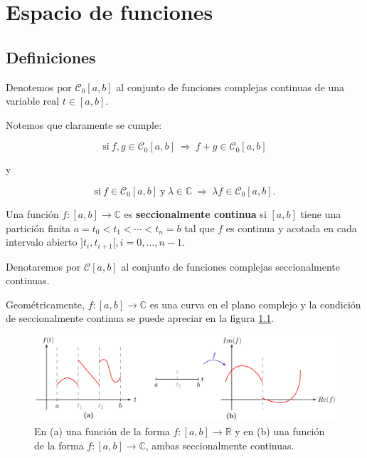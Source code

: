 \chapter{Espacio de funciones}

\section{Definiciones}

\begin{defi}
Denotemos por $\mathcal{C}_0 [a,b]$ al conjunto de funciones complejas continuas de una variable real $t \in [a,b]$.
\end{defi}

Notemos que claramente se cumple:
\begin{shaded}
$$\mbox{si} ~ f,g \in \mathcal{C}_0[a,b] ~\Rightarrow~ f + g \in \mathcal{C}_0 [a,b]$$
\end{shaded}

y 
\begin{shaded}
$$\mbox{si} ~ f \in \mathcal{C}_0[a,b] ~\mbox{y}~ \lambda \in \mathbb{C} ~\Rightarrow~ \lambda f \in  \mathcal{C}_0[a,b].$$ 
\end{shaded}

\begin{defi}
Una función $f: [a,b] \longrightarrow \mathbb{C}$ es \textbf{seccionalmente continua} si $[a,b]$ tiene una partición finita $a = t_0 < t_1 < \cdots < t_n = b$ tal que $f$ es continua y acotada en cada intervalo abierto $]t_i, t_{i+1}[, i = 0, \dots, n-1$.

Denotaremos por $\mathcal{C}[a,b]$ al conjunto de funciones complejas seccionalmente continuas.
\end{defi}

Geométricamente, $f: [a,b] \longrightarrow \mathbb{C}$ es una curva en el plano complejo y la condición de seccionalmente continua se puede apreciar en la figura \ref{fig:FunciónSC}. 

\begin{figure}
    \centering
    \includegraphics[scale=0.45]{Figuras/FuncionSC.pdf}
    \caption{En (a) una función de la forma $f: [a,b] \rightarrow \mathbb{R}$ y en (b) una función de la forma $f: [a,b] \rightarrow \mathbb{C}$, ambas seccionalmente continuas.}
    \label{fig:FunciónSC}
\end{figure}

